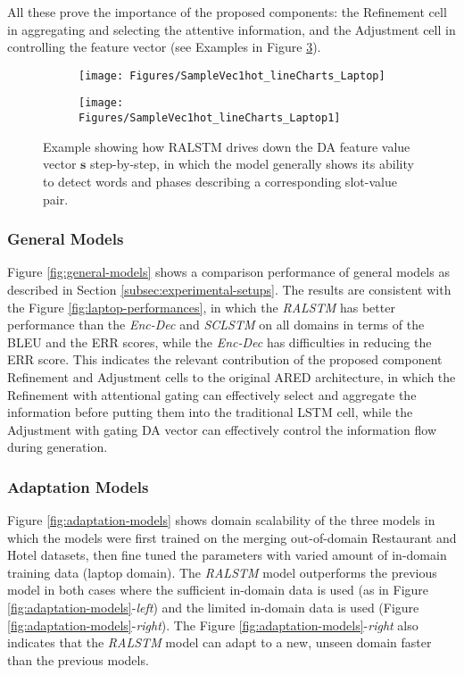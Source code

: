 \documentclass[11pt,a4paper]{article}
\begin{document}
All these prove the importance of the proposed components: the Refinement cell in aggregating and selecting the attentive information, and the Adjustment cell in controlling the feature vector (see Examples in Figure \ref{fig:DAVectoControlling}).
\begin{figure}[!ht]
	\centering
    \begin{subfigure}[b]{0.48\textwidth}
      \centering
      \texttt{[image: Figures/SampleVec1hot\_lineCharts\_Laptop]}
      \label{fig:LaptopSample}
	\end{subfigure}
    \begin{subfigure}[b]{0.48\textwidth}
      \centering
      \texttt{[image: Figures/SampleVec1hot\_lineCharts\_Laptop1]}
      \label{fig:Sample} 
    \end{subfigure}
\caption{Example showing how RALSTM drives down the DA feature value vector $\textbf{s}$ step-by-step, in which the model generally shows its ability to detect words and phases describing a corresponding slot-value pair.}   
\label{fig:DAVectoControlling}
\end{figure}
\subsubsection*{General Models}
Figure \ref{fig:general-models} shows a comparison performance of general models as described in Section \ref{subsec:experimental-setups}. The results are consistent with the Figure \ref{fig:laptop-performances}, in which the \textit{RALSTM} has better performance than the \textit{Enc-Dec} and \textit{SCLSTM} on all domains in terms of the BLEU and the ERR scores, while the \textit{Enc-Dec} has difficulties in reducing the ERR score. This indicates the relevant contribution of the proposed component Refinement and Adjustment cells to the original ARED architecture, in which the Refinement with attentional gating can effectively select and aggregate the information before putting them into the traditional LSTM cell, while the Adjustment with gating DA vector can effectively control the information flow during generation.
\subsubsection*{Adaptation Models}
Figure \ref{fig:adaptation-models} shows domain scalability of the three models in which the models were first trained on the merging out-of-domain Restaurant and Hotel datasets, then fine tuned the parameters with varied amount of in-domain training data (laptop domain). The \textit{RALSTM} model outperforms the previous model in both cases where the sufficient in-domain data is used (as in Figure \ref{fig:adaptation-models}-\textit{left}) and the limited in-domain data is used (Figure \ref{fig:adaptation-models}-\textit{right}). The Figure \ref{fig:adaptation-models}-\textit{right} also indicates that the \textit{RALSTM} model can adapt to a new, unseen domain faster than the previous models.
\end{document}
